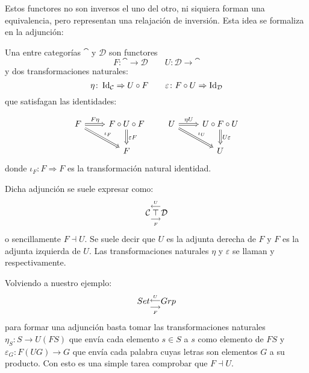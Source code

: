 Estos functores no son inversos el uno del otro, ni siquiera forman una equivalencia, pero representan una relajación de inversión.
Esta idea se formaliza en la adjunción:

\begin{definition}
Una  entre categorías $\cat$ y $\mathcal{D}$ son functores
\[ F \colon \cat \to \mathcal{D} \qquad U \colon \mathcal{D} \to \cat \]
y dos transformaciones naturales:
\[ \eta \colon \operatorname{Id}_{\mathcal{C}} \Rightarrow U \circ F \qquad \varepsilon \colon F \circ U \Rightarrow \operatorname{Id}_\mathcal{D} \]
que satisfagan las identidades:

\[
\begin{tikzcd}
F \arrow[r,Rightarrow,"F \eta"] \arrow[dr,Rightarrow,"\iota_F"] & F \circ U \circ F \arrow[d,Rightarrow,"\varepsilon F"]\\
& F
\end{tikzcd}
\qquad
\begin{tikzcd}
U \arrow[r,Rightarrow,"\eta U"] \arrow[dr,Rightarrow,"\iota_U"] & U \circ F \circ U \arrow[d,Rightarrow,"U \varepsilon"]\\
& U
\end{tikzcd}
\]
donde $\iota_F \colon F \Rightarrow F$ es la transformación natural identidad.
\end{definition}

Dicha adjunción se suele expresar como:
\[ {\mathcal{C}}
    \underset{\underset{F}{\longrightarrow}}{\overset{\overset{U}{\longleftarrow}}{\top}}
  \mathcal{D}\]
o sencillamente $F \dashv U$.
Se suele decir que $U$ es la adjunta derecha de $F$ y $F$ es la adjunta izquierda de $U$.
Las transformaciones naturales $\eta$ y $\varepsilon$ se llaman  y  respectivamente.

Volviendo a nuestro ejemplo:
\[ {Set}
    \underset{\underset{F}{\longrightarrow}}{\overset{\overset{U}{\longleftarrow}}{}}
  {Grp}\]
para formar una adjunción basta tomar las transformaciones naturales $\eta_S \colon S \to U (F S)$ que envía cada elemento $s \in S$ a $s$ como elemento de $F S$ y $\varepsilon_G \colon F (U G) \to G$ que envía cada palabra cuyas letras son elementos $G$ a su producto.
Con esto es una simple tarea comprobar que $F \dashv U$.

